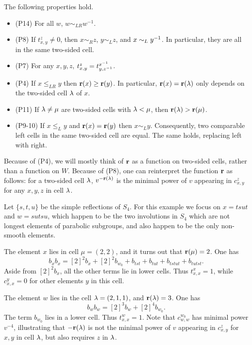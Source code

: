 \begin{prop} \label{prop:someP} The following properties hold. \begin{itemize}
\item (P14) For all $w$, $w \sim_{LR} w^{-1}$.
\item (P8) If $t^z_{x,y} \ne 0$, then $x \sim_R z$, $y \sim_L z$, and $x \sim_L y^{-1}$. In particular, they are all in the same two-sided cell.
\item (P7) For any $x, y, z$, $t^z_{x,y} = t^{x^{-1}}_{y,z^{-1}}$.
\item (P4) If $x \le_{LR} y$ then $\mathbf{r}(x) \ge \mathbf{r}(y)$. In particular, $\mathbf{r}(x) = \mathbf{r}(\lambda)$ only depends on the two-sided cell $\lambda$ of $x$.
\item (P11) If $\lambda \ne \mu$ are two-sided cells with $\lambda < \mu$, then $\mathbf{r}(\lambda) > \mathbf{r}(\mu)$.
\item (P9-10) If $x \le_L y$ and $\mathbf{r}(x) = \mathbf{r}(y)$ then $x \sim_L y$. Consequently, two comparable left cells in the same two-sided cell are equal. The same holds, replacing left with right.
\end{itemize} \end{prop}

Because of (P4), we will mostly think of $\mathbf{r}$ as a function on two-sided cells, rather than a function on $W$. Because of (P8), one can reinterpret the function $\mathbf{r}$ as follows: for a
two-sided cell $\lambda$, $v^{-\mathbf{r}(\lambda)}$ is the minimal power of $v$ appearing in $c^z_{x,y}$ for any $x, y, z$ in cell $\lambda$.

\begin{example} \label{ex:boundviolated}
Let $\{s,t,u\}$ be the simple reflections of $S_4$. For this example we focus on $x = tsut$ and $w = sutsu$, which happen to be the two involutions in $S_4$ which are not longest elements of parabolic subgroups, and also happen to be the only non-smooth elements.

The element $x$ lies in cell $\mu = (2,2)$, and it turns out that $\mathbf{r}(\mu)=2$. One has \begin{equation} \label{eq:x2} b_x b_x = [2]^2 b_x + [2]^2 b_{w_0} + b_{tst} + b_{tut} + b_{tstut}
+ b_{tutst}.\end{equation} Aside from $[2]^2 b_x$, all the other terms lie in lower cells. Thus $t^x_{x,x} = 1$, while $c^y_{x,x} = 0$ for other elements $y$ in this cell.

The element $w$ lies in the cell $\lambda = (2,1,1)$, and $\mathbf{r}(\lambda) = 3$. One has \begin{equation} \label{eq:w2} b_w b_w = [2]^3 b_w + [2]^4 b_{w_0}.\end{equation} The term $b_{w_0}$ lies in a
lower cell. Thus $t^w_{x,x} = 1$. Note that $c^{w_0}_{w,w}$ has minimal power $v^{-4}$, illustrating that $-\mathbf{r}(\lambda)$ is not the minimal power of $v$ appearing in $c^z_{x,y}$ for $x, y$
in cell $\lambda$, but also requires $z$ in $\lambda$. %
\end{example}

